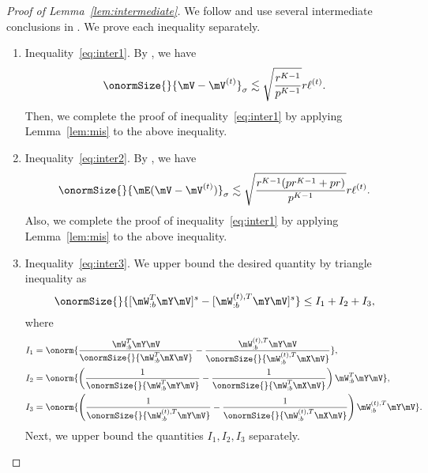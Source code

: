 \documentclass[lettersize,onecolumn,journal]{IEEEtran}
\theoremstyle{definition}
\theoremstyle{definition}
\newcommand{\of}[1]{\left(#1\right)}
\begin{document}
    \begin{proof}[Proof of Lemma~\ref{lem:intermediate}] We follow and use several intermediate conclusions in \citet[Proof of Lemma 5]{han2020exact}. We prove each inequality separately.
    \begin{enumerate}
    \item Inequality~\eqref{eq:inter1}. By \citet[Proof of Lemma 5]{han2020exact}, we have 
    \begin{equation}
         \onormSize{}{\mV - \mV^{(t)}}_{\sigma} \lesssim \sqrt{\frac{r^{K-1}}{p^{K-1}}} r \ell^{(t)}.
    \end{equation}
    Then, we complete the proof of inequality~\eqref{eq:inter1} by applying Lemma~\ref{lem:mis} to the above inequality.
    \item Inequality~\eqref{eq:inter2}. By \citet[Proof of Lemma 5]{han2020exact}, we have 
    \begin{equation}
           \onormSize{}{\mE (\mV - \mV^{(t)})}_{\sigma} \lesssim \sqrt{ \frac{r^{K-1}(p r^{K-1} + p r)}{p^{K-1}}} r \ell^{(t)}.
    \end{equation}
    Also, we complete the proof of inequality~\eqref{eq:inter1} by applying Lemma~\ref{lem:mis} to the above inequality.
    
    \item Inequality~\eqref{eq:inter3}. We upper bound the desired quantity by triangle inequality as
    \begin{equation}
        \onormSize{}{ [ \mW_{:b}^T \mY \mV ]^s   -  [ \mW_{:b}^{(t), T} \mY \mV  ]^s } \leq I_1 + I_2 + I_3,
    \end{equation}
    where 
    \begin{align}
        I_1 &=  \onorm{ \frac{ \mW_{:b}^T \mY \mV  }{\onormSize{}{  \mW_{:b}^T \mX \mV }} - \frac{ \mW_{:b}^{(t), T} \mY \mV  }{ \onormSize{}{\mW_{:b}^{(t), T} \mX \mV }}   },\\
        I_2 & = \onorm{\of{ \frac{1}{\onormSize{}{\mW_{:b}^T \mY \mV}} -  \frac{1}{\onormSize{}{\mW_{:b}^T \mX \mV}}  } \mW_{:b}^T \mY \mV },\\
        I_3 &= \onorm{\of{ \frac{1}{\onormSize{}{\mW_{:b}^{(t), T} \mY \mV  }} -  \frac{1}{\onormSize{}{\mW_{:b}^{(t), T} \mX \mV  }}  } \mW_{:b}^{(t), T} \mY \mV }.
    \end{align}
    Next, we upper bound the quantities $I_1, I_2, I_3$ separately. 
    

\end{enumerate}
\end{proof}
\end{document}
